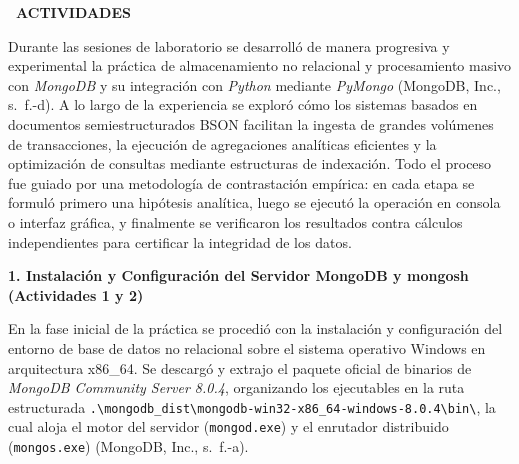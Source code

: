 \documentclass[12pt,a4paper]{article}
\newcommand{\llav}{\symbol{60}\symbol{60}}
\newcommand{\rlav}{\symbol{62}\symbol{62}}
\newcommand{\marcador}[1]{\llav\ #1\ \rlav}
\newcommand{\seccion}[1]{%
  \vspace{0.6cm}%
  {\centering\bfseries\fontsize{12pt}{14pt}\selectfont\marcador{\MakeUppercase{#1}}\par}%
  \vspace{0.35cm}%
}
\begin{document}
\vspace{0.5cm}


\seccion{ACTIVIDADES}

Durante las sesiones de laboratorio se desarrolló de manera progresiva y experimental la práctica de almacenamiento no relacional y procesamiento masivo con \textit{MongoDB} y su integración con \textit{Python} mediante \textit{PyMongo} (MongoDB, Inc., s.~f.-d). A lo largo de la experiencia se exploró cómo los sistemas basados en documentos semiestructurados BSON facilitan la ingesta de grandes volúmenes de transacciones, la ejecución de agregaciones analíticas eficientes y la optimización de consultas mediante estructuras de indexación. Todo el proceso fue guiado por una metodología de contrastación empírica: en cada etapa se formuló primero una hipótesis analítica, luego se ejecutó la operación en consola o interfaz gráfica, y finalmente se verificaron los resultados contra cálculos independientes para certificar la integridad de los datos.

\vspace{0.2cm}
\noindent\textbf{1. Instalación y Configuración del Servidor MongoDB y mongosh (Actividades 1 y 2)}

En la fase inicial de la práctica se procedió con la instalación y configuración del entorno de base de datos no relacional sobre el sistema operativo Windows en arquitectura x86\_64. Se descargó y extrajo el paquete oficial de binarios de \textit{MongoDB Community Server 8.0.4}, organizando los ejecutables en la ruta estructurada \texttt{.\textbackslash mongodb\_dist\textbackslash mongodb-win32-x86\_64-windows-8.0.4\textbackslash bin\textbackslash}, la cual aloja el motor del servidor (\texttt{mongod.exe}) y el enrutador distribuido (\texttt{mongos.exe}) (MongoDB, Inc., s.~f.-a).
\end{document}
